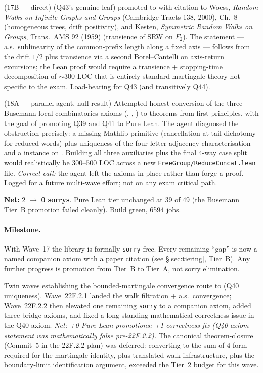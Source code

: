 \documentclass[11pt,a4paper]{article}
\newcommand{\cmd}[1]{\texttt{\small #1}}
\newcommand{\lmod}[1]{\texttt{\small #1}}
\theoremstyle{plain}
\theoremstyle{definition}
\begin{document}
(17B --- direct)  (Q43's genuine leaf)
promoted to  with citation to Woess, \emph{Random Walks on
Infinite Graphs and Groups} (Cambridge Tracts 138, 2000), Ch.~8
(homogeneous trees, drift positivity), and Kesten, \emph{Symmetric
Random Walks on Groups}, Trans.\ AMS 92 (1959) (transience of SRW on
$F_2$). The statement --- a.s.\ sublinearity of the common-prefix
length along a fixed axis --- follows from the drift $1/2$ plus
transience via a second Borel--Cantelli on axis-return excursions;
the Lean proof would require a transience + stopping-time
decomposition of $\sim$300 LOC that is entirely standard
martingale theory not specific to the exam. Load-bearing for Q43
(and transitively Q44).

(18A --- parallel agent, null result) Attempted honest conversion of
the three Busemann local-combinatorics axioms
(, ,
) to theorems from first
principles, with the goal of promoting Q39 and Q41 to Pure Lean. The
agent diagnosed the obstruction precisely: a missing Mathlib primitive
 (cancellation-at-tail
dichotomy for reduced words) plus uniqueness of the four-letter
adjacency characterisation and a  instance on
. Building all three auxiliaries plus the final
4-way case split would realistically be 300--500 LOC across a new
\lmod{FreeGroup/ReduceConcat.lean} file. \emph{Correct call:} the
agent left the axioms in place rather than forge a proof. Logged for
a future multi-wave effort; not on any exam critical path.

\textbf{Net:} 2 $\to$ \textbf{0 sorrys}. Pure Lean tier unchanged at
39 of 49 (the Busemann Tier~B promotion failed cleanly). Build green,
6594 jobs.

\paragraph{Milestone.} With Wave~17 the library is formally
\cmd{sorry}-free. Every remaining ``gap'' is now a named companion
axiom with a paper citation (see \S\ref{sec:tiering}, Tier~B).
Any further progress is promotion from Tier~B to Tier~A, not sorry
elimination.

Twin waves establishing the bounded-martingale convergence route
to  (Q40 uniqueness).
Wave~22F.2.1 landed the walk filtration + a.s.\ convergence; Wave~22F.2.2
then elevated one remaining \cmd{sorry} to a companion axiom, added
three bridge axioms, and fixed a long-standing mathematical
correctness issue in the Q40 axiom. \emph{Net: +0 Pure Lean
promotions; +1 correctness fix (Q40 axiom statement was
mathematically false pre-22F.2.2).} The canonical theorem-closure
(Commit~5 in the 22F.2.2 plan) was deferred: converting
 to the sum-of-4 form required for the
martingale identity, plus translated-walk infrastructure, plus the
boundary-limit identification argument, exceeded the Tier~2 budget
for this wave.
\end{document}
